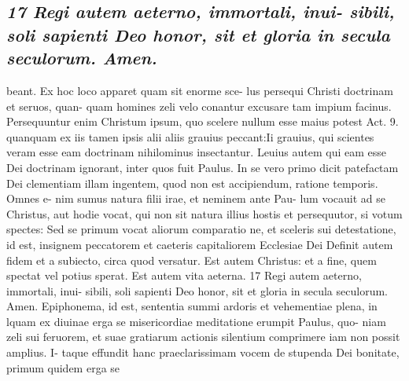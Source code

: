 \documentclass{article}
\begin{document}
\begin{pages}
\subsection*{\textit{17 Regi autem aeterno, immortali, inui- sibili, soli sapienti Deo honor, sit et gloria in secula seculorum. Amen.}}beant. Ex hoc loco apparet quam sit enorme sce- lus persequi Christi doctrinam et seruos, quan- quam homines zeli velo conantur excusare tam impium facinus. Persequuntur enim Christum ipsum, quo scelere nullum esse maius potest Act. 9. quanquam ex iis tamen ipsis alii aliis grauius peccant:Ii grauius, qui scientes veram esse eam doctrinam nihilominus insectantur. Leuius autem qui eam esse Dei doctrinam ignorant, inter quos fuit Paulus. In se vero primo dicit patefactam Dei clementiam illam ingentem, quod non est accipiendum, ratione temporis. Omnes e- nim sumus natura filii irae, et neminem ante Pau- lum vocauit ad se Christus, aut hodie vocat, qui non sit natura illius hostis et persequutor, si votum spectes: Sed se primum vocat aliorum comparatio ne, et sceleris sui detestatione, id est, insignem peccatorem et caeteris capitaliorem Ecclesiae Dei Definit autem fidem et a subiecto, circa quod versatur. Est autem Christus: et a fine, quem spectat vel potius sperat. Est autem vita aeterna. 17 Regi autem aeterno, immortali, inui- sibili, soli sapienti Deo honor, sit et gloria in secula seculorum. Amen. Epiphonema, id est, sententia summi ardoris et vehementiae plena, in lquam ex diuinae erga se misericordiae meditatione erumpit Paulus, quo- niam zeli sui feruorem, et suae gratiarum actionis silentium comprimere iam non possit amplius. I- taque effundit hanc praeclarissimam vocem de stupenda Dei bonitate, primum quidem erga se  \pend

\end{pages}
\end{document}
